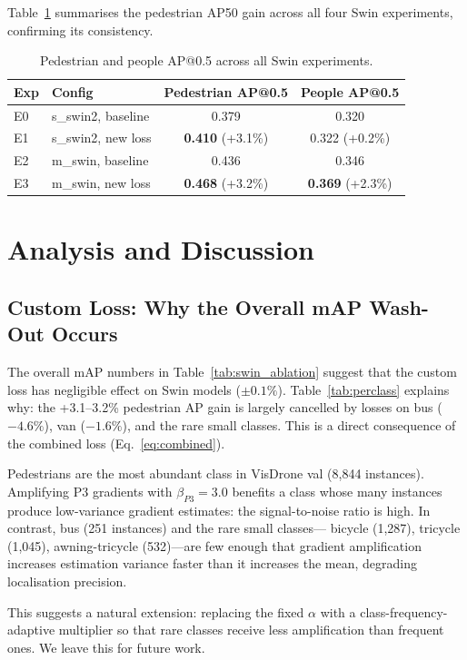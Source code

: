 \documentclass[conference]{IEEEtran}
\begin{document}
Table~\ref{tab:perclass_summary} summarises the pedestrian AP50 gain across
all four Swin experiments, confirming its consistency.

\begin{table}[t]
\centering
\caption{Pedestrian and people AP@0.5 across all Swin experiments.}
\begin{tabular}{llcc}
\toprule
\textbf{Exp} & \textbf{Config}
  & \textbf{Pedestrian AP@0.5} & \textbf{People AP@0.5} \\
\midrule
E0 & s\_swin2, baseline & 0.379 & 0.320 \\
E1 & s\_swin2, new loss & \textbf{0.410} (+3.1\%) & 0.322 (+0.2\%) \\
E2 & m\_swin, baseline  & 0.436 & 0.346 \\
E3 & m\_swin, new loss  & \textbf{0.468} (+3.2\%) & \textbf{0.369} (+2.3\%) \\
\bottomrule
\end{tabular}
\label{tab:perclass_summary}
\end{table}

\section{Analysis and Discussion}
\subsection{Custom Loss: Why the Overall mAP Wash-Out Occurs}

The overall mAP numbers in Table~\ref{tab:swin_ablation} suggest that the
custom loss has negligible effect on Swin models ($\pm 0.1\%$).
Table~\ref{tab:perclass} explains why: the +3.1--3.2\% pedestrian AP gain is
largely cancelled by losses on bus ($-4.6\%$), van ($-1.6\%$), and the rare
small classes.  This is a direct consequence of the combined loss
(Eq.~\ref{eq:combined}).

Pedestrians are the most abundant class in VisDrone val (8,844 instances).
Amplifying P3 gradients with $\beta_{P3}=3.0$ benefits a class whose many
instances produce low-variance gradient estimates: the signal-to-noise ratio
is high.  In contrast, bus (251 instances) and the rare small classes---
bicycle (1,287), tricycle (1,045), awning-tricycle (532)---are few enough
that gradient amplification increases estimation variance faster than it
increases the mean, degrading localisation precision.

This suggests a natural extension: replacing the fixed $\alpha$ with a
class-frequency-adaptive multiplier so that rare classes receive less
amplification than frequent ones.  We leave this for future work.
\end{document}
